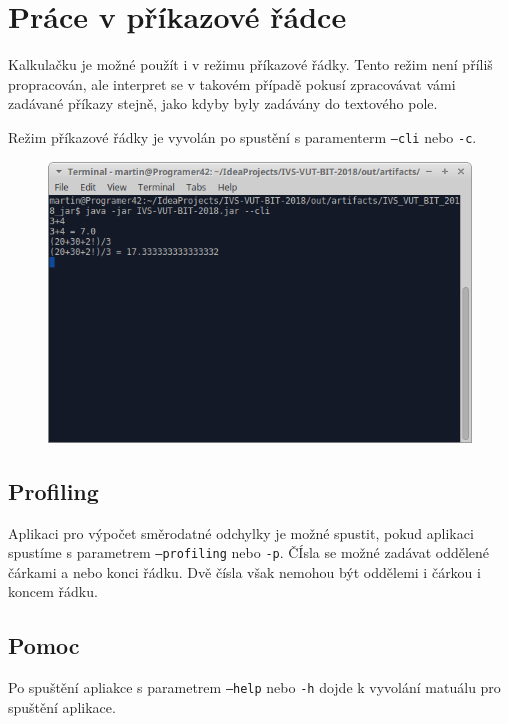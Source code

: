 \documentclass[11pt, a4paper, titlepage]{article}
\begin{document}
	\newpage

	\section{Práce v příkazové řádce}

	Kalkulačku je možné použít i v režimu příkazové řádky. Tento režim není příliš propracován,
	ale interpret se v takovém případě pokusí zpracovávat vámi zadávané příkazy stejně, jako kdyby 
	byly zadávány do textového pole.

	Režim příkazové řádky je vyvolán po spustění s paramenterm \texttt{--cli} nebo \texttt{-c}.

	\begin{figure}[h!]
	    \centering
	    \includegraphics[scale=0.8]{./assets/cli.png}
	\end{figure}

	\subsection{Profiling}

	Aplikaci pro výpočet směrodatné odchylky je možné spustit, pokud aplikaci spustíme s parametrem
	\texttt{--profiling} nebo \texttt{-p}. ČÍsla se možné zadávat oddělené čárkami a nebo konci řádku.
	Dvě čísla však nemohou být oddělemi i čárkou i koncem řádku.

	\subsection{Pomoc}

	Po spuštění apliakce s parametrem \texttt{--help} nebo \texttt{-h} dojde k vyvolání matuálu pro 
	spuštění aplikace.
	
\end{document}
